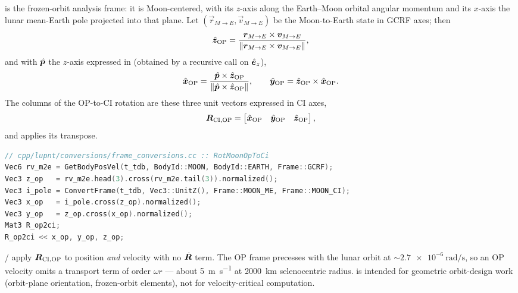  is the frozen-orbit analysis frame: it is Moon-centered,
with its $z$-axis along the Earth--Moon orbital angular momentum and its
$x$-axis the lunar mean-Earth pole projected into that plane. Let
$(\vec{r}_{M\to E}, \vec{v}_{M\to E})$ be the Moon-to-Earth state in GCRF
axes; then
%
\begin{equation}
  \label{eq:fc-moonop-z}
  \hat{\bm{z}}_{\mathrm{OP}}
  = \frac{\bm{r}_{M\to E}\times\bm{v}_{M\to E}}
         {\lVert\bm{r}_{M\to E}\times\bm{v}_{M\to E}\rVert},
\end{equation}
%
and with $\hat{\bm{p}}$ the  $z$-axis expressed in
 (obtained by a recursive  call on
$\hat{\bm{e}}_z$),
%
\begin{equation}
  \label{eq:fc-moonop-xy}
  \hat{\bm{x}}_{\mathrm{OP}}
  = \frac{\hat{\bm{p}}\times\hat{\bm{z}}_{\mathrm{OP}}}
         {\lVert\hat{\bm{p}}\times\hat{\bm{z}}_{\mathrm{OP}}\rVert},
  \qquad
  \hat{\bm{y}}_{\mathrm{OP}} = \hat{\bm{z}}_{\mathrm{OP}}\times\hat{\bm{x}}_{\mathrm{OP}} .
\end{equation}
%
The columns of the OP-to-CI rotation are these three unit vectors expressed
in CI axes,
%
\begin{equation}
  \label{eq:fc-moonop-R}
  \bm{R}_{\mathrm{CI},\mathrm{OP}}
  = \begin{bmatrix}
      \hat{\bm{x}}_{\mathrm{OP}} & \hat{\bm{y}}_{\mathrm{OP}} & \hat{\bm{z}}_{\mathrm{OP}}
    \end{bmatrix},
\end{equation}
%
and  applies its transpose.

\begin{lstlisting}[language=cpp, caption={Orbit-plane triad
  (\texttt{cpp/lupnt/conversions/frame\_conversions.cc}).},
  label={lst:fc-moonop}]
// cpp/lupnt/conversions/frame_conversions.cc :: RotMoonOpToCi
Vec6 rv_m2e = GetBodyPosVel(t_tdb, BodyId::MOON, BodyId::EARTH, Frame::GCRF);
Vec3 z_op   = rv_m2e.head(3).cross(rv_m2e.tail(3)).normalized();
Vec3 i_pole = ConvertFrame(t_tdb, Vec3::UnitZ(), Frame::MOON_ME, Frame::MOON_CI);
Vec3 x_op   = i_pole.cross(z_op).normalized();
Vec3 y_op   = z_op.cross(x_op).normalized();
Mat3 R_op2ci;
R_op2ci << x_op, y_op, z_op;
\end{lstlisting}

\begin{lupntwarning}
  / apply $\bm{R}_{\mathrm{CI},\mathrm{OP}}$
  to position \emph{and} velocity with no $\dot{\bm{R}}$ term. The OP frame
  precesses with the lunar orbit at
  $\sim\SI{2.7e-6}{\radian\per\second}$, so an OP velocity omits a transport
  term of order $\omega r$ --- about \SI{5}{\meter\per\second} at
  \SI{2000}{\kilo\meter} selenocentric radius.  is intended
  for geometric orbit-design work (orbit-plane orientation, frozen-orbit
  elements), not for velocity-critical computation.
\end{lupntwarning}

